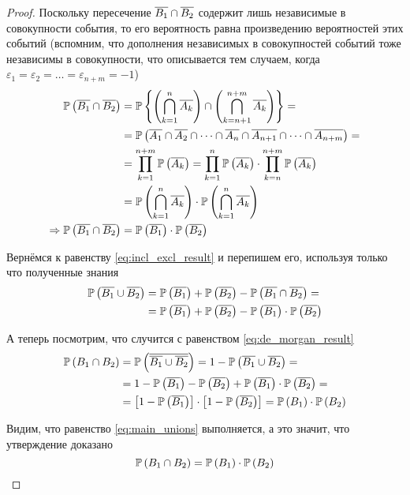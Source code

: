 \begin{proof}
    Поскольку пересечение $\overline{B_1}\cap \overline{B_2}$
    содержит лишь независимые в совокупности события,
    то его вероятность равна произведению вероятностей этих событий
    (вспомним, что дополнения независимых в совокупностей событий
    тоже независимы в совокупности, что описывается тем случаем, когда
    $\varepsilon_1=\varepsilon_2=\dots=\varepsilon_{n+m}=-1$)
    \begin{align*}
        \mathbb{P}\left( \overline{B_1}\cap \overline{B_2} \right)
            &=\mathbb{P}\left\{ 
                \left(\bigcap_{k=1}^n \overline{A_k}\right)
                \cap
                \left(\bigcap_{k=n+1}^{n+m} \overline{A_k}\right) \right\}=\\
            &=\mathbb{P}\left( 
                \overline{A_1}\cap\overline{A_2}\cap
                \dots\cap\overline{A_n}\cap\overline{A_{n+1}}\cap
                \dots\cap\overline{A_{n+m}} \right)=\\
            &=\prod_{k=1}^{n+m}\mathbb{P}\left( \overline{A_k} \right)
            =\prod_{k=1}^n \mathbb{P}\left( \overline{A_k} \right)
                \cdot\prod_{k=n}^{n+m} \mathbb{P}\left( \overline{A_k} \right)\\
            &=\mathbb{P}\left( \bigcap_{k=1}^{n} \overline{A_k} \right)
                \cdot\mathbb{P}\left( \bigcap_{k=1}^{n} \overline{A_k} \right)\\
        \Rightarrow\mathbb{P}\left( \overline{B_1}\cap \overline{B_2} \right)
            &=\mathbb{P}\left( \overline{B_1} \right)\cdot\mathbb{P}\left( \overline{B_2} \right)
    \end{align*}

    Вернёмся к равенству \eqref{eq:incl_excl_result} и перепишем его,
    используя только что полученные знания
    \begin{align*}
    \mathbb{P}\left( \overline{B_1}\cup \overline{B_2} \right)
    &=\mathbb{P}\left( \overline{B_1} \right)+\mathbb{P}\left( \overline{B_2} \right)
        -\mathbb{P}\left( \overline{B_1}\cap \overline{B_2} \right)=\\
    &=\mathbb{P}\left( \overline{B_1} \right)+\mathbb{P}\left( \overline{B_2} \right)
        -\mathbb{P}\left( \overline{B_1} \right)\cdot \mathbb{P}\left( \overline{B_2} \right)
    \end{align*}

    А теперь посмотрим, что случится с равенством \eqref{eq:de_morgan_result}
    \begin{align*}
        \mathbb{P}\left( B_1\cap B_2 \right)
        &=\mathbb{P}\left( \overline{\overline{B_1}\cup \overline{B_2}} \right)
        =1-\mathbb{P}\left( {\overline{B_1}\cup \overline{B_2}} \right)=\\
        &=1-\mathbb{P}\left( \overline{B_1} \right)-\mathbb{P}\left( \overline{B_2} \right)
        +\mathbb{P}\left( \overline{B_1} \right)\cdot \mathbb{P}\left( \overline{B_2} \right)=\\
        &=\left[1-\mathbb{P}\left( \overline{B_1} \right)\right]
            \cdot\left[1-\mathbb{P}\left( \overline{B_2} \right)\right]
        =\mathbb{P}\left( B_1 \right)\cdot\mathbb{P}\left( B_2 \right)
    \end{align*}

    Видим, что равенство \eqref{eq:main_unions} выполняется,
    а это значит, что утверждение доказано
    $$\mathbb{P}\left( B_1\cap B_2 \right)=\mathbb{P}\left( B_1 \right)\cdot\mathbb{P}\left( B_2 \right)$$

\end{proof}
